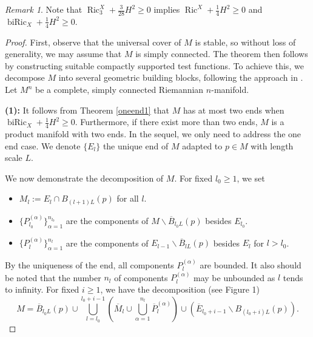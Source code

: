 \documentclass[11pt,letterpaper]{amsart}
\DeclareMathOperator{\Ric}{Ric}
\DeclareMathOperator{\biRic}{biRic}
\newcommand{\oB}{\overline{B}}
\newcommand{\oE}{\overline{E}}
\newcommand{\oM}{\overline{M}}
\newcommand{\oP}{\overline{P}}
\theoremstyle{definition}
\theoremstyle{remark}
\newtheorem{remark}[theorem]{Remark}
\numberwithin{equation}{section}
\begin{document}
\begin{remark}\label{curvaturerelations}
    Note that $\Ric^X_{3}+\frac{3}{28}H^2 \geq 0$ implies $\Ric^X+\frac{1}{4}H^2\geq 0$ and $\biRic_X+\frac{1}{4}H^2\geq 0$.
\end{remark}
\begin{proof}
First, observe that the universal cover of 
$M$ is stable, so without loss of generality, we may assume that 
$M$ is simply connected. The theorem then follows by constructing suitable compactly supported test functions. To achieve this, we decompose 
$M$ into several geometric building blocks, following the approach in \cite{chodosh-li-stryker}. Let 
$M^n$ be a complete, simply connected Riemannian 
$n$-manifold.

\textbf{\textbf{(1):}}  It follows from Theorem \ref{oneend1} that $M$ has at most two ends when $\biRic_X+\frac{1}{4}H^2\geq 0$. Furthermore, if there exist more than two ends, $M$ is a product manifold  with two ends. In the sequel, we only need to address the one end case. We denote $\{E_l\}$ the unique end of $M$ adapted to $p\in M$ with length scale $L$.

We now demonstrate the decomposition of $M$. For fixed $l_0\geqslant 1$, we set
\begin{itemize}
    \item $M_l:=E_l\cap B_{(l+1)L}(p)$ for all $l$.
    \item $\{P^{(\alpha)}_{l_0}\}_{\alpha=1}^{n_{l_0}}$ are the components of $M\backslash \oB_{l_0L}(p)$ besides $E_{l_0}$.
    \item $\{P^{(\alpha)}_{l}\}_{\alpha=1}^{n_{l}}$ are the components of $E_{l-1}\backslash \oB_{lL}(p)$ besides $E_{l}$ for $l>l_0$.
    
\end{itemize}
By the uniqueness of the end, all components $P_l^{(\alpha)}$ are bounded. It also should be noted that the number $n_l$ of components $P_l^{(\alpha)}$ may be unbounded as $l$ tends to infinity. For fixed $i \geq 1$, we have the decomposition (see Figure 1)
\begin{equation*}
    M=\oB_{l_0L}(p)\cup\bigcup_{l=l_0}^{l_0+i-1}\left(\oM_l\cup\bigcup_{\alpha=1}^{n_l}\oP_l^{(\alpha)}\right)\cup \left(\oE_{l_0+i-1}\backslash B_{(l_0+i)L}(p)\right).
\end{equation*}


\end{proof}
\end{document}
